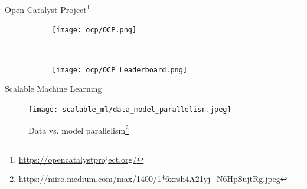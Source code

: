 \begin{frame}{Open Catalyst Project\footnote{\url{https://opencatalystproject.org/}}}
    \begin{figure}
        \begin{subfigure}[t]{0.49\textwidth}
            \texttt{[image: ocp/OCP.png]}
        \end{subfigure}%
        ~
        \begin{subfigure}[t]{0.49\textwidth}
            \texttt{[image: ocp/OCP\_Leaderboard.png]}
        \end{subfigure}
    \end{figure}
    \vspace*{1em}
\end{frame}

\begin{frame}{Scalable Machine Learning}

    \begin{figure}[H]
        \texttt{[image: scalable\_ml/data\_model\_parallelism.jpeg]}
        \caption*{Data vs. model parallelism\footnote{\url{https://miro.medium.com/max/1400/1*6xrsh4A21yj_N6HpSujtRg.jpeg}}}
    \end{figure}

\end{frame}